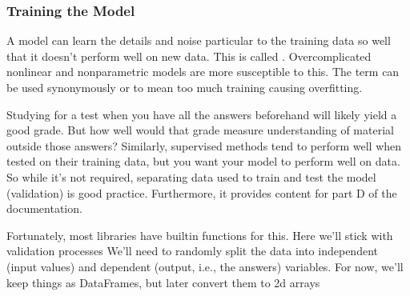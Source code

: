 \documentclass[letterpaper,10pt,english]{jupyterBook}
\begin{document}
\subsubsection{Training the Model}
\label{\detokenize{task2_c/example_sup_class/sup_class_ex-develop:training-the-model}}\label{\detokenize{task2_c/example_sup_class/sup_class_ex-develop:sup-class-ex-develop-train}}
\begin{sphinxShadowBox}
\sphinxstylesidebartitle{}

\sphinxAtStartPar
A model can learn the details and noise particular to the training data so well that it doesn’t perform well on new data. This is called . Overcomplicated non\sphinxhyphen{}linear and nonparametric models are more susceptible to this. The term  can be used synonymously or to mean too much training causing overfitting.
\end{sphinxShadowBox}

\sphinxAtStartPar
Studying for a test when you have all the answers beforehand will likely yield a good grade. But how well would that grade measure understanding of material outside those answers? Similarly, supervised methods tend to perform well when tested on their training data, but you want your model to perform well on  data. So while it’s not required, separating data used to train and test the model (validation) is good practice. Furthermore, it provides content for part D of the documentation.

\sphinxAtStartPar
Fortunately, most libraries have built\sphinxhyphen{}in functions for this. Here we’ll stick with  validation processes We’ll need to randomly split the data into independent (input values) and dependent (output, i.e., the answers) variables. For now, we’ll keep things as DataFrames, but later convert them to 2\sphinxhyphen{}d arrays
\end{document}
